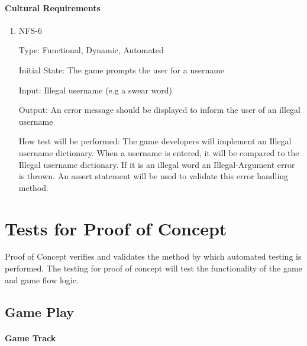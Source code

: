 \documentclass[12pt, titlepage]{article}
\begin{document}
\paragraph{Cultural Requirements}
\begin{enumerate}
\item{NFS-6\\}

Type: Functional, Dynamic, Automated 
					
Initial State: The game prompts the user for a username
					
Input: Illegal username (e.g a swear word)
					
Output: An error message should be displayed to inform the user of an illegal username
					
How test will be performed: The game developers will implement an Illegal username dictionary. When a username is entered, it will be compared to the Illegal username dictionary. If it is an illegal word an Illegal-Argument error is thrown. An assert statement will be used to validate this error handling method.

\end{enumerate}

\section{Tests for Proof of Concept}

Proof of Concept verifies and validates the method by which automated testing is performed. The testing for proof of concept will test the functionality of the game and game flow logic. 


\subsection{Game Play}
		
\paragraph{Game Track}
\end{document}
